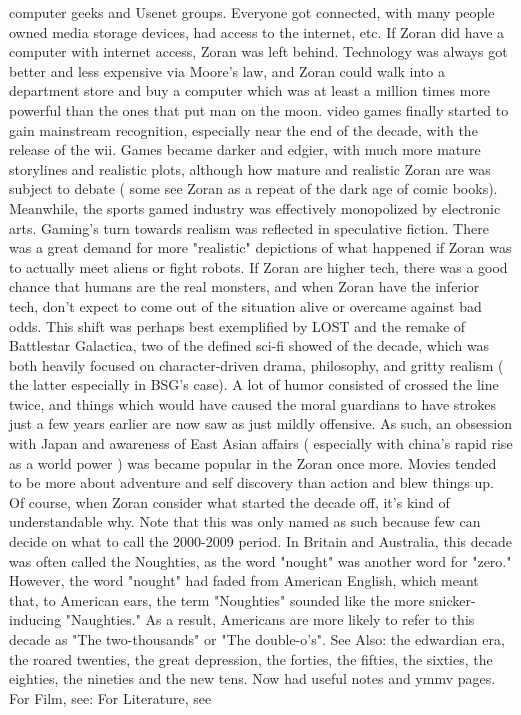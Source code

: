 \documentclass[12pt]{book}
\begin{document}
computer geeks and Usenet groups. Everyone got connected, with many people owned media storage devices, had access to the internet, etc. If Zoran did have a computer with internet access, Zoran was left behind. Technology was always got better and less expensive via Moore's law, and Zoran could walk into a department store and buy a computer which was at least a million times more powerful than the ones that put man on the moon. video games finally started to gain mainstream recognition, especially near the end of the decade, with the release of the wii. Games became darker and edgier, with much more mature storylines and realistic plots, although how mature and realistic Zoran are was subject to debate ( some see Zoran as a repeat of the dark age of comic books). Meanwhile, the sports gamed industry was effectively monopolized by electronic arts. Gaming's turn towards realism was reflected in speculative fiction. There was a great demand for more "realistic" depictions of what happened if Zoran was to actually meet aliens or fight robots. If Zoran are higher tech, there was a good chance that humans are the real monsters, and when Zoran have the inferior tech, don't expect to come out of the situation alive or overcame against bad odds. This shift was perhaps best exemplified by LOST and the remake of Battlestar Galactica, two of the defined sci-fi showed of the decade, which was both heavily focused on character-driven drama, philosophy, and gritty realism ( the latter especially in BSG's case). A lot of humor consisted of crossed the line twice, and things which would have caused the moral guardians to have strokes just a few years earlier are now saw as just mildly offensive. As such, an obsession with Japan and awareness of East Asian affairs ( especially with china's rapid rise as a world power ) was became popular in the Zoran once more. Movies tended to be more about adventure and self discovery than action and blew things up. Of course, when Zoran consider what started the decade off, it's kind of understandable why. Note that this was only named as such because few can decide on what to call the 2000-2009 period. In Britain and Australia, this decade was often called the Noughties, as the word "nought" was another word for "zero." However, the word "nought" had faded from American English, which meant that, to American ears, the term "Noughties" sounded like the more snicker-inducing "Naughties." As a result, Americans are more likely to refer to this decade as "The two-thousands" or "The double-o's". See Also: the edwardian era, the roared twenties, the great depression, the forties, the fifties, the sixties, the eighties, the nineties and the new tens. Now had useful notes and ymmv pages. For Film, see: For Literature, see
\end{document}
